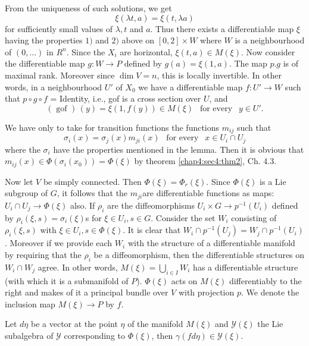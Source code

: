 From the uniqueness of such solutions, we get 
$$
\xi (\lambda t,a) = \xi(t, \lambda a)
$$
for sufficiently small values of $\lambda, t$ and $a$. Thus there
exists a differentiable map $\xi$ having the properties $1)$ and $2)$
above on $[0, 2] \times W$ where $W$ is a neighbourhood of $(0,
\ldots)$ in $R^n$. Since the $X_i$ are horizontal, $\xi (t, a) \in
M(\xi)$. Now consider the differentiable map $g : W \to P$ defined by
$g(a) = \xi (1, a)$. The map $p.g$ is of maximal rank. Moreover since
$\dim V = n$, this is locally invertible. In other words, in a
neighbourhood $U'$ of $X_0$ we have a differentiable map $f :U' \to W$
such that $p \circ g \circ f$ = Identity, i.e., gof is a cross section over $U$,
and  
$$
(\text{ gof }) \,(y) = \xi (1, f(y)) \in M (\xi) ~~\text{ for every }~~ y \in U'.
$$

\setcounter{proof of theorem}{3}
\begin{proof of theorem}%
  We have only to take for transition functions the functions $m_{ij}$
  such that  
  $$
  \sigma_i(x) = \sigma_j (x) m_{ji}(x) ~~\text{ for every } ~~x \in
  U_i \cap U_j 
  $$
  where the $\sigma_i$ have the properties mentioned in the lemma. Then
  it is obvious that $m_{ij}(x) \in \Phi(\sigma_i(x_0)) = \Phi(\xi)$
  by theorem \ref{chap4:sec4:thm2}, Ch. 4.3. 
\end{proof of theorem}

Now let $V$ be simply connected. Then $\Phi (\xi) = \Phi_r
(\xi)$. Since $\Phi(\xi)$ is a Lie subgroup of $G$, it follows \cite{11}
that the $m_{ji}$\pageoriginale are differentiable functions as maps: $U_i \cap U_j
\to \Phi (\xi)$ also. 
If $\rho_i$ are the diffeomorphisms $U_i \times G \to p^{-1} (U_i)$
defined by $\rho_i(\xi, s) = \sigma_i(\xi)$s for $\xi \in U_i, s \in
G$. Consider the set $W_i$ consisting of $\rho_i(\xi, s)$ with $\xi
\in U_i, s \in \Phi (\xi)$. It is clear that $W_i \cap p^{-1}(U_j) =
W_j \cap p^{-1} (U_i)$. Moreover if we provide each $W_i$ with the
structure of a differentiable manifold by requiring that the $\rho_i$
be a diffeomorphism, then the differentiable structures on $W_i \cap
W_j$ agree. In other words, $M (\xi) = \bigcup \limits_{i \in I} W_i$
has a differentiable structure (with which it is a submanifold of
$P$). $\Phi (\xi)$ acts on $M (\xi)$ differentiably to the right and
makes of it a principal bundle over $V$ with projection $p$. We denote
the inclusion map $M (\xi) \to P$ by $f$.

\begin{proposition}\label{chap4:sec7:prop5}%
  Let $d \eta$ be a vector at the point $\eta$ of the manifold
  $M(\xi)$ and $\mathscr{Y} (\xi)$ the Lie subalgebra of $\mathscr{Y}$
  corresponding to $\Phi (\xi)$, then $\gamma(fd \eta) \in \mathscr{Y}
  (\xi)$. 
\end{proposition}

